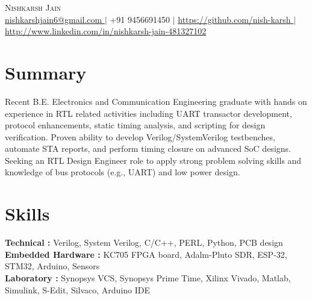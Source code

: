 \documentclass[letterpaper,11pt]{article}
\begin{document}
\begin{center}
    {\Huge \scshape Nishkarsh Jain} \\ \vspace{4pt}
    \small
\href{mailto:nishkarshjain6@gmail.com}{ nishkarshjain6@gmail.com } $|$ +91 9456691450 $|$ \href{ https://github.com/nish-karsh }{ https://github.com/nish-karsh } $|$ \href{ http://www.linkedin.com/in/nishkarsh-jain-481327102 }{ http://www.linkedin.com/in/nishkarsh-jain-481327102 }\end{center}

\section{Summary}
\small{ Recent B.E. Electronics and Communication Engineering graduate with hands on experience in RTL related activities including UART transactor development, protocol enhancements, static timing analysis, and scripting for design verification. Proven ability to develop Verilog/SystemVerilog testbenches, automate STA reports, and perform timing closure on advanced SoC designs. Seeking an RTL Design Engineer role to apply strong problem solving skills and knowledge of bus protocols (e.g., UART) and low power design. }

\section{Skills}
\begin{itemize}[leftmargin=0.15in, label={}]
  \small{\item{
    \textbf{ Technical :} Verilog, System Verilog, C/C++, PERL, Python, PCB design \\
    \textbf{ Embedded Hardware :} KC705 FPGA board, Adalm-Pluto SDR, ESP-32, STM32, Arduino, Sensors \\
    \textbf{ Laboratory :} Synopsys VCS, Synopsys Prime Time, Xilinx Vivado, Matlab, Simulink, S-Edit, Silvaco, Arduino IDE \\
  }}
\end{itemize}
\end{document}
